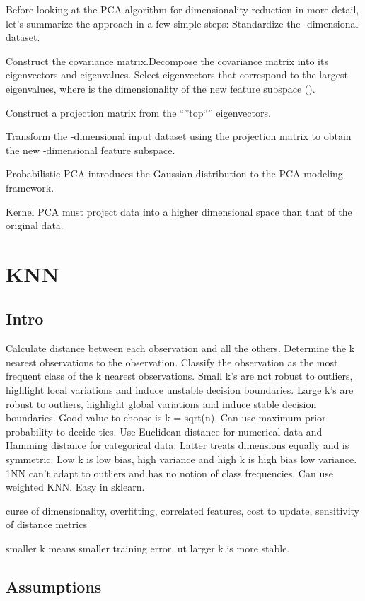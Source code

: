 \documentclass[]{book}
\theoremstyle{definition}
\theoremstyle{definition}
\theoremstyle{definition}
\theoremstyle{remark}
\begin{document}
Before looking at the PCA algorithm for dimensionality reduction in more
detail, let's summarize the approach in a few simple steps: Standardize
the -dimensional dataset.

Construct the covariance matrix.Decompose the covariance matrix into its
eigenvectors and eigenvalues. Select eigenvectors that correspond to the
largest eigenvalues, where is the dimensionality of the new feature
subspace ().

Construct a projection matrix from the ``''top``'' eigenvectors.

Transform the -dimensional input dataset using the projection matrix to
obtain the new -dimensional feature subspace.

Probabilistic PCA introduces the Gaussian distribution to the PCA
modeling framework.

Kernel PCA must project data into a higher dimensional space than that
of the original data.

\section{KNN}\label{knn}

\subsection{Intro}\label{intro-8}

Calculate distance between each observation and all the others.
Determine the k nearest observations to the observation. Classify the
observation as the most frequent class of the k nearest observations.
Small k's are not robust to outliers, highlight local variations and
induce unstable decision boundaries. Large k's are robust to outliers,
highlight global variations and induce stable decision boundaries. Good
value to choose is k = sqrt(n). Can use maximum prior probability to
decide ties. Use Euclidean distance for numerical data and Hamming
distance for categorical data. Latter treats dimensions equally and is
symmetric. Low k is low bias, high variance and high k is high bias low
variance. 1NN can't adapt to outliers and has no notion of class
frequencies. Can use weighted KNN. Easy in sklearn.

curse of dimensionality, overfitting, correlated features, cost to
update, sensitivity of distance metrics

smaller k means smaller training error, ut larger k is more stable.

\subsection{Assumptions}\label{assumptions-8}
\end{document}
